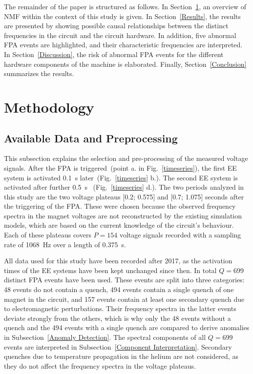 \documentclass[lettersize,journal]{IEEEtran}
\begin{document}
The remainder of the paper is structured as follows. 
In Section~\ref{Methodology}, an overview of NMF within the context of this study is given. 
In Section~\ref{Results}, the results are presented by showing possible causal relationships between the distinct frequencies in the circuit and the circuit hardware.
In addition, five abnormal FPA events are highlighted, and their characteristic frequencies are interpreted.
In Section~\ref{Discussion}, the risk of abnormal FPA events for the different hardware components of the machine is elaborated. Finally, Section~\ref{Conclusion} summarizes the results.

\section{Methodology} \label{Methodology}

\subsection{Available Data and Preprocessing}
This subsection explains the selection and pre-processing of the measured voltage signals. 
After the FPA is triggered~(point a. in Fig.~\ref{timeseries}), the first EE system is activated 0.1~s later~(Fig.~\ref{timeseries} b.). The second EE system is activated after further 0.5~s ~(Fig.~\ref{timeseries} d.). 
The two periods analyzed in this study are the two voltage plateaus [0.2; 0.575] and [0.7; 1.075] seconds after the triggering of the FPA.
These were chosen because the observed frequency spectra in the magnet voltages are not reconstructed by the existing simulation models, which are based on the current knowledge of the circuit's behaviour.
Each of these plateaus covers $P=154$ voltage signals recorded with a sampling rate of 1068~Hz over a length of 0.375~s. 

All data used for this study have been recorded after 2017, as the activation times of the EE systems have been kept unchanged since then. In total $Q=699$ distinct FPA events have been used. 
These events are split into three categories: 48 events do not contain a quench, 494 events contain a single quench of one magnet in the circuit, and 157 events contain at least one secondary quench due to electromagnetic perturbations. 
Their frequency spectra in the latter events deviate strongly from the others, which is why only the 48 events without a quench and the 494 events with a single quench are compared to derive anomalies in Subsection~\ref{Anomaly Detection}.
The spectral components of all $Q=699$ events are interpreted in Subsection~\ref{Component Interpretation}.
Secondary quenches due to temperature propagation in the helium are not considered, as they do not affect the frequency spectra in the voltage plateaus.
\end{document}
